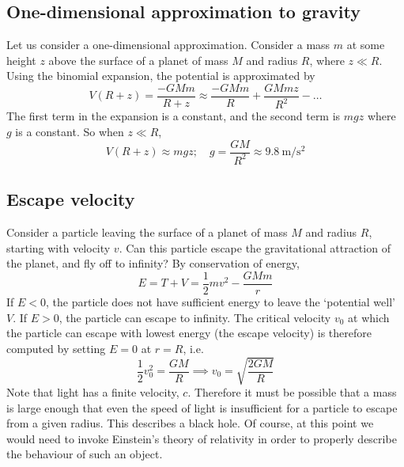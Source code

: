\subsection{One-dimensional approximation to gravity}
Let us consider a one-dimensional approximation.
Consider a mass \(m\) at some height \(z\) above the surface of a planet of mass \(M\) and radius \(R\), where \(z \ll R\).
Using the binomial expansion, the potential is approximated by
\[
	V(R + z) = \frac{-GMm}{R + z} \approx \frac{-GMm}{R} + \frac{GMmz}{R^2} - \dots
\]
The first term in the expansion is a constant, and the second term is \(mgz\) where \(g\) is a constant.
So when \(z \ll R\),
\[
	V(R + z) \approx mgz;\quad g = \frac{GM}{R^2} \approx \SI{9.8}{\metre\per\second\squared}
\]

\subsection{Escape velocity}
Consider a particle leaving the surface of a planet of mass \(M\) and radius \(R\), starting with velocity \(v\).
Can this particle escape the gravitational attraction of the planet, and fly off to infinity?
By conservation of energy,
\[
	E = T + V = \frac{1}{2}mv^2 - \frac{GMm}{r}
\]
If \(E < 0\), the particle does not have sufficient energy to leave the `potential well' \(V\).
If \(E > 0\), the particle can escape to infinity.
The critical velocity \(v_0\) at which the particle can escape with lowest energy (the escape velocity) is therefore computed by setting \(E = 0\) at \(r=R\), i.e.
\[
	\frac{1}{2}v_0^2 = \frac{GM}{R} \implies v_0 = \sqrt{\frac{2GM}{R}}
\]
Note that light has a finite velocity, \(c\).
Therefore it must be possible that a mass is large enough that even the speed of light is insufficient for a particle to escape from a given radius.
This describes a black hole.
Of course, at this point we would need to invoke Einstein's theory of relativity in order to properly describe the behaviour of such an object.

